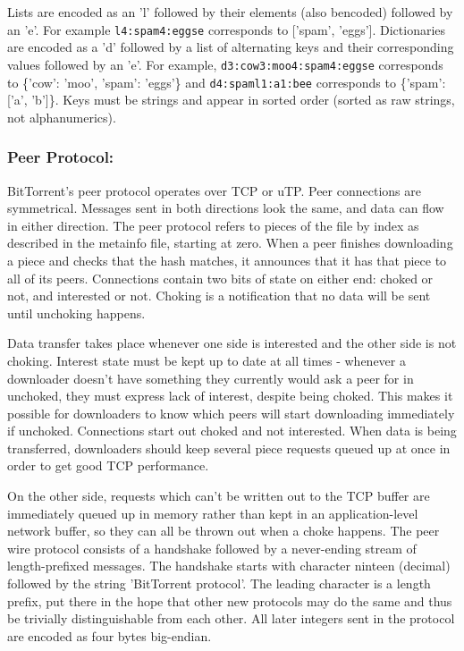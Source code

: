 \documentclass[a4paper,12pt]{article}
\begin{document}
Lists are encoded as an 'l' followed by their elements (also bencoded) followed by an 'e'. For example \texttt{l4:spam4:eggse} corresponds to ['spam', 'eggs']. Dictionaries are encoded as a 'd' followed by a list of alternating keys and their corresponding values followed by an 'e'. For example, \texttt{d3:cow3:moo4:spam4:eggse} corresponds to \{'cow': 'moo', 'spam': 'eggs'\} and \texttt{d4:spaml1:a1:bee} corresponds to \{'spam': ['a', 'b']\}. Keys must be strings and appear in sorted order (sorted as raw strings, not alphanumerics).

\subsubsection{Peer Protocol:}

BitTorrent's peer protocol operates over TCP or uTP. Peer connections are symmetrical. Messages sent in both directions look the same, and data can flow in either direction. The peer protocol refers to pieces of the file by index as described in the metainfo file, starting at zero. When a peer finishes downloading a piece and checks that the hash matches, it announces that it has that piece to all of its peers. Connections contain two bits of state on either end: choked or not, and interested or not. Choking is a notification that no data will be sent until unchoking happens.

Data transfer takes place whenever one side is interested and the other side is not choking. Interest state must be kept up to date at all times - whenever a downloader doesn't have something they currently would ask a peer for in unchoked, they must express lack of interest, despite being choked. This makes it possible for downloaders to know which peers will start downloading immediately if unchoked. Connections start out choked and not interested. When data is being transferred, downloaders should keep several piece requests queued up at once in order to get good TCP performance. 

On the other side, requests which can't be written out to the TCP buffer are immediately queued up in memory rather than kept in an application-level network buffer, so they can all be thrown out when a choke happens. The peer wire protocol consists of a handshake followed by a never-ending stream of length-prefixed messages. The handshake starts with character ninteen (decimal) followed by the string 'BitTorrent protocol'. The leading character is a length prefix, put there in the hope that other new protocols may do the same and thus be trivially distinguishable from each other. All later integers sent in the protocol are encoded as four bytes big-endian. 
\end{document}
